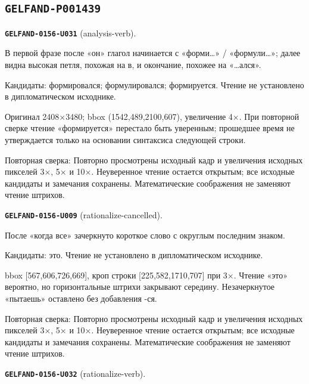 \subsection*{\texttt{GELFAND-P001439}}
\par\noindent\leavevmode{}\label{GELFAND-0156-U031}\label{GELFAND-P001439:analysis-verb}\textbf{\texttt{GELFAND-0156-U031}} (analysis-verb).\nopagebreak[4]\par
В первой фразе после «он» глагол начинается с «форми…» / «формули…»; далее видна высокая петля, похожая на в, и окончание, похожее на «…ался».\par
Кандидаты: формировался; формулировался; формируется. Чтение не установлено в дипломатическом исходнике.\par
Оригинал 2408×3480; bbox (1542,489,2100,607), увеличение 4×. При повторной сверке чтение «формируется» перестало быть уверенным; прошедшее время не утверждается только на основании синтаксиса следующей строки.\par
Повторная сверка: Повторно просмотрены исходный кадр и увеличения исходных пикселей 3×, 5× и 10×. Неуверенное чтение остается открытым; все исходные кандидаты и замечания сохранены. Математические соображения не заменяют чтение штрихов.\par\medskip
\par\noindent\leavevmode{}\label{GELFAND-0156-U009}\label{GELFAND-P001439:rationalize-cancelled}\textbf{\texttt{GELFAND-0156-U009}} (rationalize-cancelled).\nopagebreak[4]\par
После «когда все» зачеркнуто короткое слово с округлым последним знаком.\par
Кандидаты: это. Чтение не установлено в дипломатическом исходнике.\par
bbox [567,606,726,669], кроп строки [225,582,1710,707] при 3×. Чтение «это» вероятно, но горизонтальные штрихи закрывают середину. Незачеркнутое «пытаешь» оставлено без добавления -ся.\par
Повторная сверка: Повторно просмотрены исходный кадр и увеличения исходных пикселей 3×, 5× и 10×. Неуверенное чтение остается открытым; все исходные кандидаты и замечания сохранены. Математические соображения не заменяют чтение штрихов.\par\medskip
\par\noindent\leavevmode{}\label{GELFAND-0156-U032}\label{GELFAND-P001439:rationalize-verb}\textbf{\texttt{GELFAND-0156-U032}} (rationalize-verb).\nopagebreak[4]\par
